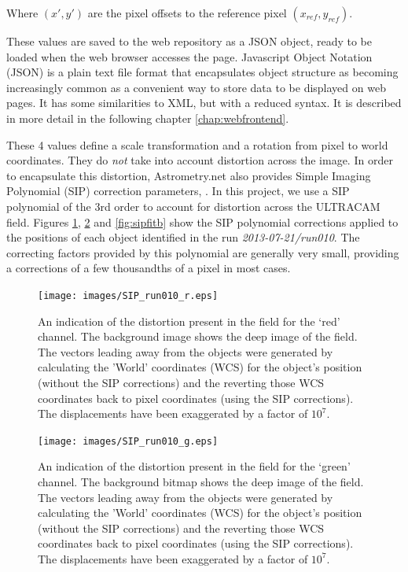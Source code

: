 Where $(x', y')$ are the pixel offsets to the reference pixel $(x_{ref}, y_{ref})$.

These values are saved to the web repository as a JSON object, ready to be loaded when the web browser accesses the page. Javascript Object Notation (JSON) is a plain text file format that encapsulates object structure as becoming increasingly common as a convenient way to store data to be displayed on web pages. It has some similarities to XML, but with a reduced syntax. It is described in more detail in the following chapter \ref{chap:webfrontend}.

These 4 values define a scale transformation and a rotation from pixel to world coordinates. They do \emph{not} take into account distortion across the image. In order to encapsulate this distortion, Astrometry.net also provides Simple Imaging Polynomial (SIP) correction parameters, \citep{sippolynomial}. In this project, we use a SIP polynomial of the 3rd order to account for distortion across the ULTRACAM field. Figures \ref{fig:sipfitr}, \ref{fig:sipfitg} and \ref{fig:sipfitb} show the SIP polynomial corrections applied to the positions of each object identified in the run \emph{2013-07-21/run010}. The correcting factors provided by this polynomial are generally very small, providing a corrections of a few thousandths of a pixel in most cases. 

\begin{figure}
  \centering
  \texttt{[image: images/SIP\_run010\_r.eps]}
  \caption{An indication of the distortion present in the field for the `red' channel. The background image shows the deep image of the field. The vectors leading away from the objects were generated by calculating the 'World' coordinates (WCS) for the object's position (without the SIP corrections) and the reverting those WCS coordinates back to pixel coordinates (using the SIP corrections). The displacements have been exaggerated by a factor of $10^7$.}
\label{fig:sipfitr}
\end{figure}
  
\begin{figure}
  \centering
  \texttt{[image: images/SIP\_run010\_g.eps]}
  \caption{An indication of the distortion present in the field for the `green' channel. The background bitmap shows the deep image of the field. The vectors leading away from the objects were generated by calculating the 'World' coordinates (WCS) for the object's position (without the SIP corrections) and the reverting those WCS coordinates back to pixel coordinates (using the SIP corrections). The displacements have been exaggerated by a factor of $10^7$.}
\label{fig:sipfitg}
\end{figure}
  
